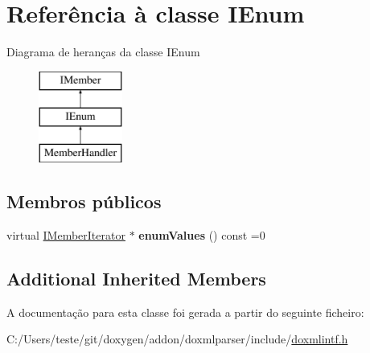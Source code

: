 \hypertarget{class_i_enum}{\section{Referência à classe I\-Enum}
\label{class_i_enum}
}
Diagrama de heranças da classe I\-Enum\begin{figure}[H]
\begin{center}
\leavevmode
\includegraphics[height=3.000000cm]{class_i_enum}
\end{center}
\end{figure}
\subsection*{Membros públicos}
\begin{DoxyCompactItemize}
\item 
\hypertarget{class_i_enum_abd1a22e3e2c02379854fe7ae471b28ba}{virtual \hyperlink{class_i_member_iterator}{I\-Member\-Iterator} $\ast$ {\bfseries enum\-Values} () const =0}\label{class_i_enum_abd1a22e3e2c02379854fe7ae471b28ba}

\end{DoxyCompactItemize}
\subsection*{Additional Inherited Members}


A documentação para esta classe foi gerada a partir do seguinte ficheiro\-:\begin{DoxyCompactItemize}
\item 
C\-:/\-Users/teste/git/doxygen/addon/doxmlparser/include/\hyperlink{include_2doxmlintf_8h}{doxmlintf.\-h}\end{DoxyCompactItemize}
